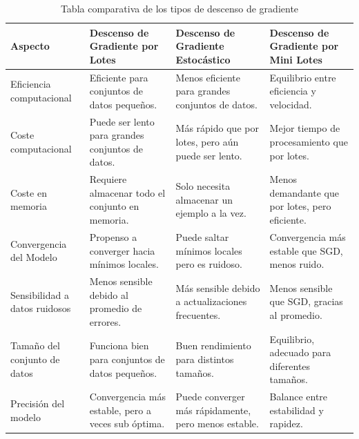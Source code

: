 \begin{table}[H]
    \centering
    \footnotesize
    \begin{tabularx}{0.95\linewidth}{|p{3cm}|X|X|X|}
        \hline
        \textbf{Aspecto}              & \textbf{Descenso de Gradiente por Lotes}           & \textbf{Descenso de Gradiente Estocástico}           & \textbf{Descenso de Gradiente por Mini Lotes}   \\
        \hline
        Eficiencia computacional      & Eficiente para conjuntos de datos pequeños.        & Menos eficiente para grandes conjuntos de datos.     & Equilibrio entre eficiencia y velocidad.        \\
        \hline
        Coste computacional           & Puede ser lento para grandes conjuntos de datos.   & Más rápido que por lotes, pero aún puede ser lento.  & Mejor tiempo de procesamiento que por lotes.    \\
        \hline
        Coste en memoria              & Requiere almacenar todo el conjunto en memoria.    & Solo necesita almacenar un ejemplo a la vez.         & Menos demandante que por lotes, pero eficiente. \\
        \hline
        Convergencia del Modelo       & Propenso a converger hacia mínimos locales.        & Puede saltar mínimos locales pero es ruidoso.        & Convergencia más estable que SGD, menos ruido.  \\
        \hline
        Sensibilidad a datos ruidosos & Menos sensible debido al promedio de errores.      & Más sensible debido a actualizaciones frecuentes.    & Menos sensible que SGD, gracias al promedio.    \\
        \hline
        Tamaño del conjunto de datos  & Funciona bien para conjuntos de datos pequeños.    & Buen rendimiento para distintos tamaños.             & Equilibrio, adecuado para diferentes tamaños.   \\
        \hline
        Precisión del modelo          & Convergencia más estable, pero a veces sub óptima. & Puede converger más rápidamente, pero menos estable. & Balance entre estabilidad y rapidez.            \\
        \hline
    \end{tabularx}
    \caption{Tabla comparativa de los tipos de descenso de gradiente}
    \label{tab:tabla-comparativa}
\end{table}


